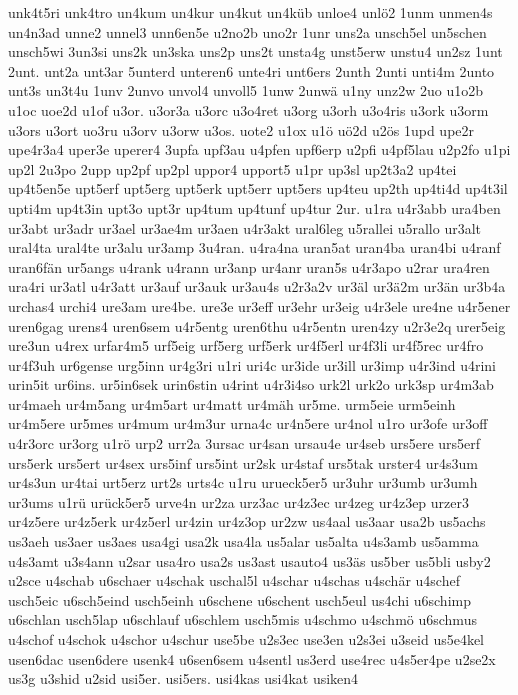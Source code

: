 {unk4t5ri
unk4tro
un4kum
un4kur
un4kut
un4küb
unloe4
unlö2
1unm
unmen4s
un4n3ad
unne2
unnel3
unn6en5e
u2no2b
uno2r
1unr
uns2a
unsch5el
un5schen
unsch5wi
3un3si
uns2k
un3ska
uns2p
uns2t
unsta4g
unst5erw
unstu4
un2sz
1unt
2unt.
unt2a
unt3ar
5unterd
unteren6
unte4ri
unt6ers
2unth
2unti
unti4m
2unto
unt3s
un3t4u
1unv
2unvo
unvol4
unvoll5
1unw
2unwä
u1ny
unz2w
2uo
u1o2b
u1oc
uoe2d
u1of
u3or.
u3or3a
u3orc
u3o4ret
u3org
u3orh
u3o4ris
u3ork
u3orm
u3ors
u3ort
uo3ru
u3orv
u3orw
u3os.
uote2
u1ox
u1ö
uö2d
u2ös
1upd
upe2r
upe4r3a4
uper3e
uperer4
3upfa
upf3au
u4pfen
upf6erp
u2pfi
u4pf5lau
u2p2fo
u1pi
up2l
2u3po
2upp
up2pf
up2pl
uppor4
upport5
u1pr
up3sl
up2t3a2
up4tei
up4t5en5e
upt5erf
upt5erg
upt5erk
upt5err
upt5ers
up4teu
up2th
up4ti4d
up4t3il
upti4m
up4t3in
upt3o
upt3r
up4tum
up4tunf
up4tur
2ur.
u1ra
u4r3abb
ura4ben
ur3abt
ur3adr
ur3ael
ur3ae4m
ur3aen
u4r3akt
ural6leg
u5rallei
u5rallo
ur3alt
ural4ta
ural4te
ur3alu
ur3amp
3u4ran.
u4ra4na
uran5at
uran4ba
uran4bi
u4ranf
uran6fän
ur5angs
u4rank
u4rann
ur3anp
ur4anr
uran5s
u4r3apo
u2rar
ura4ren
ura4ri
ur3atl
u4r3att
ur3auf
ur3auk
ur3au4s
u2r3a2v
ur3äl
ur3ä2m
ur3än
ur3b4a
urchas4
urchi4
ure3am
ure4be.
ure3e
ur3eff
ur3ehr
ur3eig
u4r3ele
ure4ne
u4r5ener
uren6gag
urens4
uren6sem
u4r5entg
uren6thu
u4r5entn
uren4zy
u2r3e2q
urer5eig
ure3un
u4rex
urfar4m5
urf5eig
urf5erg
urf5erk
ur4f5erl
ur4f3li
ur4f5rec
ur4fro
ur4f3uh
ur6gense
urg5inn
ur4g3ri
u1ri
uri4c
ur3ide
ur3ill
ur3imp
u4r3ind
u4rini
urin5it
ur6ins.
ur5in6sek
urin6stin
u4rint
u4r3i4so
urk2l
urk2o
urk3sp
ur4m3ab
ur4maeh
ur4m5ang
ur4m5art
ur4matt
ur4mäh
ur5me.
urm5eie
urm5einh
ur4m5ere
ur5mes
ur4mum
ur4m3ur
urna4c
ur4n5ere
ur4nol
u1ro
ur3ofe
ur3off
u4r3orc
ur3org
u1rö
urp2
urr2a
3ursac
ur4san
ursau4e
ur4seb
urs5ere
urs5erf
urs5erk
urs5ert
ur4sex
urs5inf
urs5int
ur2sk
ur4staf
urs5tak
urster4
ur4s3um
ur4s3un
ur4tai
urt5erz
urt2s
urts4c
u1ru
urueck5er5
ur3uhr
ur3umb
ur3umh
ur3ums
u1rü
urück5er5
urve4n
ur2za
urz3ac
ur4z3ec
ur4zeg
ur4z3ep
urzer3
ur4z5ere
ur4z5erk
ur4z5erl
ur4zin
ur4z3op
ur2zw
us4aal
us3aar
usa2b
us5achs
us3aeh
us3aer
us3aes
usa4gi
usa2k
usa4la
us5alar
us5alta
u4s3amb
us5amma
u4s3amt
u3s4ann
u2sar
usa4ro
usa2s
us3ast
usauto4
us3äs
us5ber
us5bli
usby2
u2sce
u4schab
u6schaer
u4schak
uschal5l
u4schar
u4schas
u4schär
u4schef
usch5eic
u6sch5eind
usch5einh
u6schene
u6schent
usch5eul
us4chi
u6schimp
u6schlan
usch5lap
u6schlauf
u6schlem
usch5mis
u4schmo
u4schmö
u6schmus
u4schof
u4schok
u4schor
u4schur
use5be
u2s3ec
use3en
u2s3ei
u3seid
us5e4kel
usen6dac
usen6dere
usenk4
u6sen6sem
u4sentl
us3erd
use4rec
u4s5er4pe
u2se2x
us3g
u3shid
u2sid
usi5er.
usi5ers.
usi4kas
usi4kat
usiken4
}
